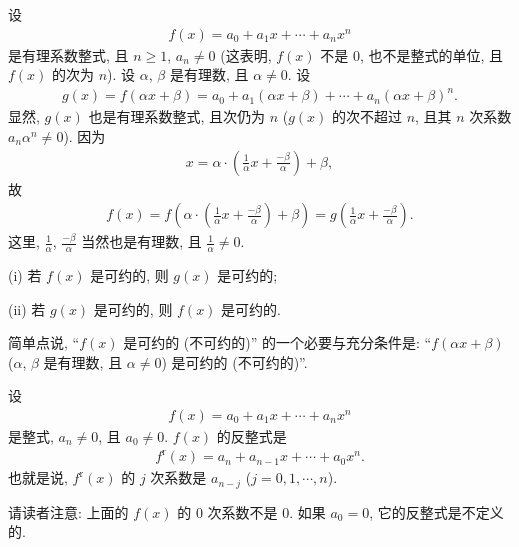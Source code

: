 \begin{proposition}
    设
    \begin{align*}
        f(x) = a_0 + a_1 x + \cdots + a_n x^n
    \end{align*}
    是有理系数整式, 且 $n \geq 1$, $a_n \neq 0$ (这表明, $f(x)$ 不是 $0$, 也不是整式的单位, 且 $f(x)$ 的次为 $n$). 设 $\alpha$, $\beta$ 是有理数, 且 $\alpha \neq 0$. 设
    \begin{align*}
        g(x) = f(\alpha x + \beta) = a_0 + a_1 (\alpha x + \beta) + \cdots + a_n (\alpha x + \beta)^n.
    \end{align*}
    显然, $g(x)$ 也是有理系数整式, 且次仍为 $n$ ($g(x)$ 的次不超过 $n$, 且其 $n$ 次系数 $a_n \alpha^n \neq 0$). 因为
    \begin{align*}
        x = \alpha \cdot \left( \frac{1}{\alpha} x + \frac{-\beta}{\alpha} \right) + \beta,
    \end{align*}
    故
    \begin{align*}
        f(x) = f\left( \alpha \cdot \left( \frac{1}{\alpha} x + \frac{-\beta}{\alpha} \right) + \beta \right) = g\left( \frac{1}{\alpha} x + \frac{-\beta}{\alpha} \right).
    \end{align*}
    这里, $\frac{1}{\alpha}$, $\frac{-\beta}{\alpha}$ 当然也是有理数, 且 $\frac{1}{\alpha} \neq 0$.

    (i) 若 $f(x)$ 是可约的, 则 $g(x)$ 是可约的;

    (ii) 若 $g(x)$ 是可约的, 则 $f(x)$ 是可约的.

    简单点说, ``$f(x)$ 是可约的 (不可约的)'' 的一个必要与充分条件是: ``$f(\alpha x + \beta)$ ($\alpha$, $\beta$ 是有理数, 且 $\alpha \neq 0$) 是可约的 (不可约的)''.
\end{proposition}

\begin{definition}
    设
    \begin{align*}
        f(x) = a_0 + a_1 x + \cdots + a_n x^n
    \end{align*}
    是整式, $a_n \neq 0$, 且 $a_0 \neq 0$. $f(x)$ 的反整式是
    \begin{align*}
        f^{\mathrm{r}} (x) = a_n + a_{n-1} x + \cdots + a_0 x^n.
    \end{align*}
    也就是说, $f^{\mathrm{r}} (x)$ 的 $j$ 次系数是 $a_{n-j}$ ($j = 0,1,\cdots,n$).

    请读者注意: 上面的 $f(x)$ 的 $0$ 次系数不是 $0$. 如果 $a_0 = 0$, 它的反整式是不定义的.
\end{definition}

